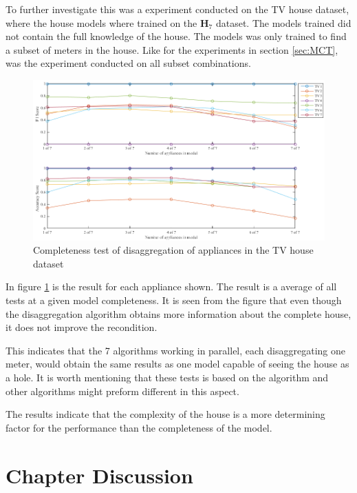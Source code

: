To further investigate this was a experiment conducted on the TV house dataset, where the house models where trained on the $\textbf{H}_{7}$ dataset. The models trained did not contain the full knowledge of the house. The models was only trained to find a subset of meters in the house. Like for the experiments in section \ref{sec:MCT}, was the experiment conducted on all subset combinations. 

\begin{figure}[H]
\centering
\includegraphics[width=1\textwidth]{billeder/ModelCompletness.png}
\caption{Completeness test of disaggregation of appliances in the TV house dataset }
\label{fig:COD}
\end{figure}

In figure \ref{fig:COD} is the result for each appliance shown. The result is a average of all tests at a given model completeness. It is seen from the figure that even though the disaggregation algorithm obtains more information about the complete house, it does not improve the recondition. 

This indicates that the 7 algorithms working in parallel, each disaggregating one meter, would obtain the same results as one model capable of seeing the house as a hole. It is worth mentioning that these tests is based on the  algorithm and other algorithms might preform different in this aspect. 

The results indicate that the complexity of the house is a more determining factor for the performance than the completeness of the model. 

\section{Chapter Discussion}
 
 
 
 
